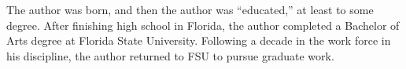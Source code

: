 \documentclass[11pt,copyright,expanded]{fsuthesis}
\begin{document}







\begin{biosketch}
The author was born, and then the author was ``educated,'' at least to
some degree.  After finishing high school in Florida, the author
completed a Bachelor of Arts degree at Florida State University.
Following a decade in the work force in his discipline, the author
returned to FSU to pursue graduate work.
\end{biosketch}

\end{document}
